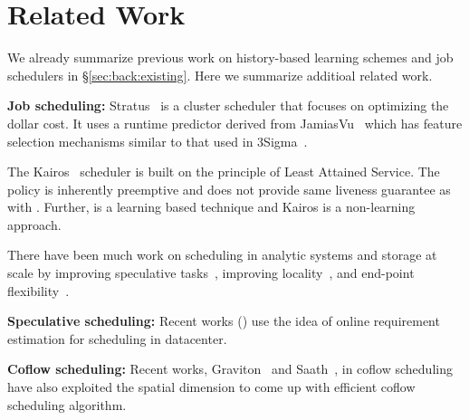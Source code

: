 \section{Related Work}
\label{sec:related}

We already summarize previous work on history-based learning schemes
and job schedulers in \S\ref{sec:back:existing}. Here we summarize
additioal related work.

\textbf{Job scheduling:}
{Stratus~\cite{stratus:socc2018} is a cluster scheduler that focuses
on optimizing the dollar cost. It uses a runtime predictor
derived from JamiasVu~\cite{jamiasvu} which has feature selection mechanisms
similar to that used in 3Sigma~\cite{3Sigma}.}

The Kairos~\cite{kairos:socc2018} scheduler is built on the principle
  of Least Attained Service.  The policy is inherently preemptive and
  does not provide same liveness guarantee as \slearn with
  \gs. Further, \slearn is a learning based technique and Kairos
  is a non-learning approach.


There have been much work on scheduling in analytic
systems and storage at scale by improving speculative tasks~\cite{late:osdi08,
mantri:OSDI2010, dolly:nsdi13}, improving locality~\cite{delay:eurosys10,
scarlett:eurosys11}, and end-point flexibility~\cite{sinbad:sigcomm13,
  pisces:osdi12}.
 
\fi
\textbf{Speculative scheduling:} Recent works
(\cite{creditscheduling:sigcomm17, trumpet:sigcomm16}) use the idea of
online requirement estimation for scheduling in datacenter.


{\textbf{Coflow scheduling:} Recent works,
  Graviton~\cite{graviton:hotcloud16} and Saath~\cite{jajooSaath}, in
  coflow scheduling have also exploited the spatial dimension to come
  up with efficient coflow scheduling algorithm.}
\fi
